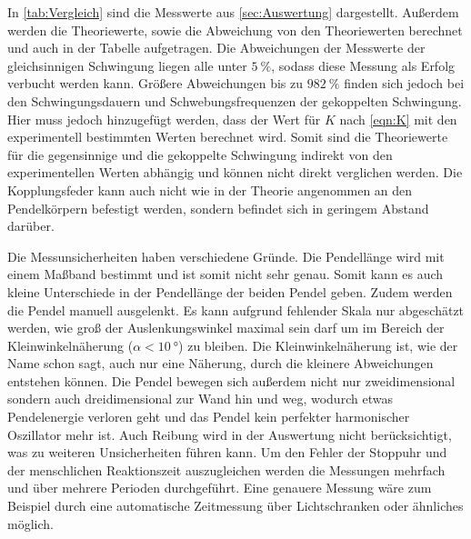 In \autoref{tab:Vergleich} sind die Messwerte aus \autoref{sec:Auswertung} dargestellt.
Außerdem werden die Theoriewerte, sowie die Abweichung von den Theoriewerten berechnet und auch in der Tabelle aufgetragen.
Die Abweichungen der Messwerte der gleichsinnigen Schwingung liegen alle unter $\qty{5}{\percent}$, sodass diese Messung als Erfolg verbucht werden kann.
Größere Abweichungen bis zu $\qty{982}{\percent}$ finden sich jedoch bei den Schwingungsdauern und Schwebungsfrequenzen der gekoppelten Schwingung.
Hier muss jedoch hinzugefügt werden, dass der Wert für $K$ nach \autoref{eqn:K} mit den experimentell bestimmten Werten berechnet wird.
Somit sind die Theoriewerte für die gegensinnige und die gekoppelte Schwingung indirekt von den experimentellen Werten abhängig und können nicht 
direkt verglichen werden. Die Kopplungsfeder kann auch nicht wie in der Theorie angenommen an den Pendelkörpern befestigt werden, sondern befindet
sich in geringem Abstand darüber.


Die Messunsicherheiten haben verschiedene Gründe.
Die Pendellänge wird mit einem Maßband bestimmt und ist somit nicht sehr genau. Somit kann es auch kleine Unterschiede in der Pendellänge der beiden 
Pendel geben.
Zudem werden die Pendel manuell ausgelenkt. Es kann aufgrund fehlender Skala nur abgeschätzt werden, wie groß der Auslenkungswinkel maximal sein darf um 
im Bereich der Kleinwinkelnäherung ($\alpha < \qty{10}{\degree}$) zu bleiben. Die Kleinwinkelnäherung ist, wie der Name schon sagt, auch nur eine Näherung,
durch die kleinere Abweichungen entstehen können.
Die Pendel bewegen sich außerdem nicht nur zweidimensional sondern auch dreidimensional zur Wand hin und weg, wodurch 
etwas Pendelenergie verloren geht und das Pendel kein perfekter harmonischer Oszillator mehr ist. 
Auch Reibung wird in der Auswertung nicht berücksichtigt, was zu weiteren Unsicherheiten führen kann.
Um den Fehler der Stoppuhr und der menschlichen Reaktionszeit auszugleichen werden die Messungen mehrfach und über mehrere Perioden durchgeführt.
Eine genauere Messung wäre zum Beispiel durch eine automatische Zeitmessung über Lichtschranken oder ähnliches möglich.



